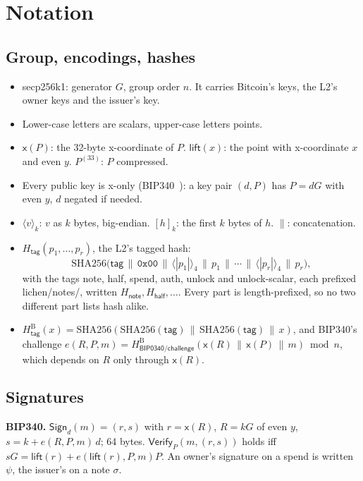 \documentclass[11pt]{article}
\theoremstyle{plain}
\theoremstyle{definition}
\newcommand{\be}[2]{\langle #1\rangle_{#2}}
\newcommand{\pre}[2]{[#1]_{#2}}
\newcommand{\xo}[1]{\mathsf{x}(#1)}
\newcommand{\Ht}[1]{H_{\textsf{#1}}}
\newcommand{\Hb}[1]{H^{\mathrm{B}}_{\textsf{#1}}}
\newcommand{\Sign}{\mathsf{Sign}}
\newcommand{\Vfy}{\mathsf{Verify}}
\begin{document}
\section{Notation}\label{sec:notation}

\subsection{Group, encodings, hashes}

\begin{itemize}[nosep]
\item secp256k1: generator $G$, group order $n$. It carries Bitcoin's
  keys, the L2's owner keys and the issuer's key.
\item Lower-case letters are scalars, upper-case letters points.
\item $\xo{P}$: the 32-byte x-coordinate of $P$. $\mathsf{lift}(x)$: the
  point with x-coordinate $x$ and even $y$. $P^{(33)}$: $P$ compressed.
\item Every public key is x-only (BIP340~\cite{bip340}): a key pair $(d,
  P)$ has $P = dG$ with even $y$, $d$ negated if needed.
\item $\be{v}{k}$: $v$ as $k$ bytes, big-endian. $\pre{h}{k}$: the first
  $k$ bytes of $h$. $\|$: concatenation.
\item $\Ht{tag}(p_1, \dots, p_r)$, the L2's tagged hash:
  \[
    \mathrm{SHA256}\big(\textsf{tag} \,\|\, \texttt{0x00} \,\|\, \be{|p_1|}{4}
    \,\|\, p_1 \,\|\, \cdots \,\|\, \be{|p_r|}{4} \,\|\, p_r\big),
  \]
  with the tags \textsf{note}, \textsf{half}, \textsf{spend},
  \textsf{auth}, \textsf{unlock} and \textsf{unlock-scalar}, each
  prefixed \textsf{lichen/notes/}, written $\Ht{note}, \Ht{half},
  \dots$. Every part is length-prefixed, so no two
  different part lists hash alike.
\item $\Hb{tag}(x) = \mathrm{SHA256}(\mathrm{SHA256}(\textsf{tag}) \,\|\,
  \mathrm{SHA256}(\textsf{tag}) \,\|\, x)$, and BIP340's challenge $e(R,
  P, m) = \Hb{BIP0340/challenge}(\xo{R} \,\|\, \xo{P} \,\|\, m) \bmod n$,
  which depends on $R$ only through $\xo{R}$.
\end{itemize}

\subsection{Signatures}

\textbf{BIP340.} $\Sign_d(m) = (r, s)$ with $r = \xo{R}$, $R = kG$ of
even $y$, $s = k + e(R, P, m)\,d$; 64 bytes. $\Vfy_P(m, (r, s))$ holds
iff $sG = \mathsf{lift}(r) + e(\mathsf{lift}(r), P, m)P$. An owner's
signature on a spend is written $\psi$, the issuer's on a note
$\sigma$.
\end{document}
